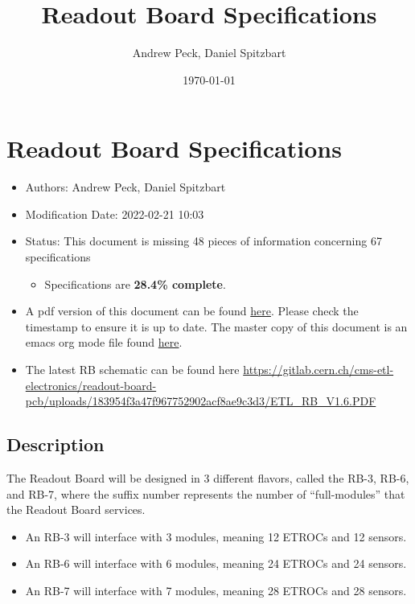 \documentclass[11pt]{article}
\author{Andrew Peck, Daniel Spitzbart}
\date{\today}
\title{Readout Board Specifications}
\begin{document}
\maketitle
\section{Readout Board Specifications}
\label{sec:orgc8fe784}

\begin{itemize}
\item Authors: Andrew Peck, Daniel Spitzbart

\item Modification Date: 2022-02-21 10:03

\item Status: This document is missing 48 pieces of information concerning  67 specifications
\begin{itemize}
\item Specifications are \textbf{28.4\% complete}.
\end{itemize}

\item A pdf version of this document can be found \href{./rb-specs.pdf}{here}. Please check the timestamp to ensure it is up to date. The master copy of this document is an emacs org mode file found \href{https://gitlab.cern.ch/cms-etl-electronics/readout-board-docs/-/blob/master/docs/Specifications/rb-specs.org}{here}.

\item The latest RB schematic can be found here \url{https://gitlab.cern.ch/cms-etl-electronics/readout-board-pcb/uploads/183954f3a47f967752902acf8ae9c3d3/ETL\_RB\_V1.6.PDF}
\end{itemize}

\setcounter{tocdepth}{3}
\tableofcontents

\subsection{Description}
\label{sec:org006bd8b}

The Readout Board will be designed in 3 different flavors, called the RB-3, RB-6, and RB-7, where the suffix number represents the number of ``full-modules'' that the Readout Board services.

\begin{itemize}
\item An RB-3 will interface with 3 modules, meaning 12 ETROCs and 12 sensors.
\item An RB-6 will interface with 6 modules, meaning 24 ETROCs and 24 sensors.
\item An RB-7 will interface with 7 modules, meaning 28 ETROCs and 28 sensors.
\end{itemize}
\end{document}
